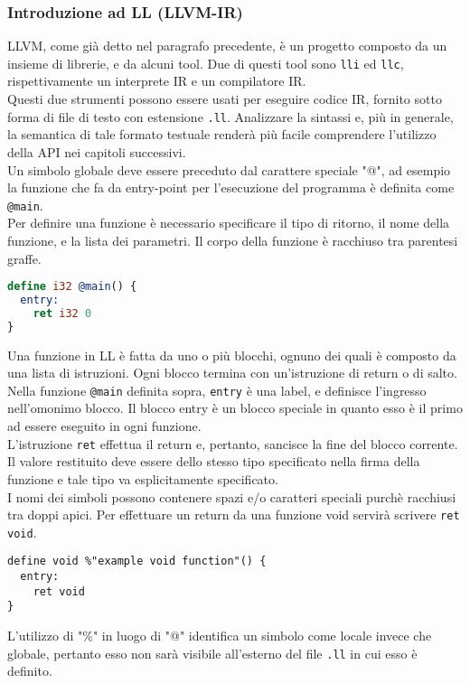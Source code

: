 \subsubsection{Introduzione ad LL (LLVM-IR)}
LLVM, come già detto nel paragrafo precedente, è un progetto composto da un 
insieme di librerie, e da alcuni tool. Due di questi tool sono \texttt{lli} ed 
\texttt{llc}, rispettivamente un interprete IR e un compilatore IR. \\

Questi due strumenti possono essere usati per eseguire codice IR, fornito 
sotto forma di file di testo con estensione \texttt{.ll}. Analizzare la sintassi 
e, più in generale, la semantica di tale formato testuale renderà più facile comprendere 
l'utilizzo della API nei capitoli successivi. \\

Un simbolo globale deve essere preceduto dal carattere speciale "@", ad 
esempio la funzione che fa da entry-point per l'esecuzione del programma 
è definita come \texttt{@main}. \\ 

Per definire una funzione è necessario specificare il tipo di ritorno, il 
nome della funzione, e la lista dei parametri. Il corpo della funzione 
è racchiuso tra parentesi graffe. \\ 

\begin{lstlisting}[frame=single, language=LLVM]
define i32 @main() {
  entry:
    ret i32 0
}
\end{lstlisting}
\vspace{0.5cm}

Una funzione in LL è fatta da uno o più blocchi, ognuno dei quali è composto da 
una lista di istruzioni. Ogni blocco termina con un'istruzione di return o di salto. 
Nella funzione \texttt{@main} definita sopra, \texttt{entry} è una label, e definisce 
l'ingresso nell'omonimo blocco. Il blocco entry è un blocco speciale in quanto esso è 
il primo ad essere eseguito in ogni funzione. \\

L'istruzione \texttt{ret} effettua il return e, pertanto, sancisce la fine del blocco 
corrente. Il valore restituito deve essere dello stesso tipo specificato nella 
firma della funzione e tale tipo va esplicitamente specificato. \\

I nomi dei simboli possono contenere spazi e/o caratteri speciali purchè
racchiusi tra doppi apici. Per effettuare un return da una funzione void 
servirà scrivere \texttt{ret void}. \\

\begin{lstlisting}[frame=single]
define void %"example void function"() {
  entry:
    ret void
}
\end{lstlisting}
\vspace{0.5cm}

L'utilizzo di "\%" in luogo di "@" identifica un simbolo come locale invece che globale, pertanto 
esso non sarà visibile all'esterno del file \texttt{.ll} in cui esso è definito.